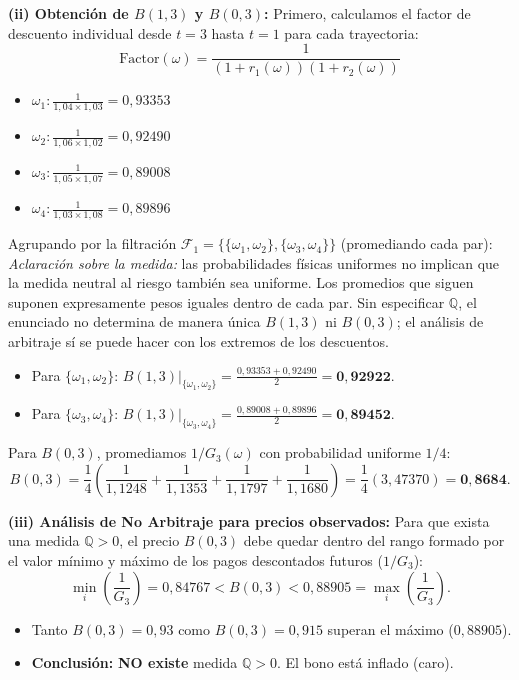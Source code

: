 \documentclass[11pt, a4paper]{article}
\begin{document}
\textbf{(ii) Obtención de $B(1,3)$ y $B(0,3)$:}
Primero, calculamos el factor de descuento individual desde $t=3$ hasta $t=1$ para cada trayectoria:
\[
\text{Factor}(\omega) = \frac{1}{(1+r_1(\omega))(1+r_2(\omega))}
\]
\begin{itemize}
    \item $\omega_1: \frac{1}{1{,}04 \times 1{,}03} = 0{,}93353$
    \item $\omega_2: \frac{1}{1{,}06 \times 1{,}02} = 0{,}92490$
    \item $\omega_3: \frac{1}{1{,}05 \times 1{,}07} = 0{,}89008$
    \item $\omega_4: \frac{1}{1{,}03 \times 1{,}08} = 0{,}89896$
\end{itemize}

Agrupando por la filtración $\mathcal{F}_1 = \{\{\omega_1,\omega_2\}, \{\omega_3,\omega_4\}\}$ (promediando cada par):
\textit{Aclaración sobre la medida:} las probabilidades físicas uniformes no implican que la medida neutral al riesgo también sea uniforme. Los promedios que siguen suponen expresamente pesos iguales dentro de cada par. Sin especificar \(\mathbb{Q}\), el enunciado no determina de manera única \(B(1,3)\) ni \(B(0,3)\); el análisis de arbitraje sí se puede hacer con los extremos de los descuentos.
\begin{itemize}
    \item Para $\{\omega_1,\omega_2\}$: $B(1,3)|_{\{\omega_1,\omega_2\}} = \frac{0{,}93353 + 0{,}92490}{2} = \mathbf{0{,}92922}$.
    \item Para $\{\omega_3,\omega_4\}$: $B(1,3)|_{\{\omega_3,\omega_4\}} = \frac{0{,}89008 + 0{,}89896}{2} = \mathbf{0{,}89452}$.
\end{itemize}

Para $B(0,3)$, promediamos $1/G_3(\omega)$ con probabilidad uniforme $1/4$:
\[
B(0,3) = \frac{1}{4} \left( \frac{1}{1{,}1248} + \frac{1}{1{,}1353} + \frac{1}{1{,}1797} + \frac{1}{1{,}1680} \right) = \frac{1}{4} (3{,}47370) = \mathbf{0{,}8684}.
\]

\textbf{(iii) Análisis de No Arbitraje para precios observados:}
Para que exista una medida $\mathbb{Q} > 0$, el precio $B(0,3)$ debe quedar dentro del rango formado por el valor mínimo y máximo de los pagos descontados futuros ($1/G_3$):
\[
\min_i \left(\frac{1}{G_3}\right) = 0{,}84767 < B(0,3) < 0{,}88905 = \max_i \left(\frac{1}{G_3}\right).
\]
\begin{itemize}
    \item Tanto $B(0,3) = 0{,}93$ como $B(0,3) = 0{,}915$ superan el máximo ($0{,}88905$).
    \item \textbf{Conclusión:} \textbf{NO existe} medida $\mathbb{Q} > 0$. El bono está inflado (caro).
\end{itemize}
\end{document}

